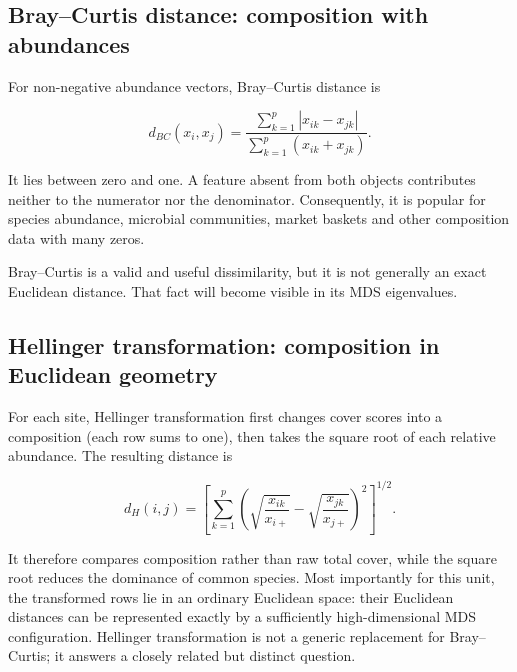 \documentclass[
  english,
]{article}
\begin{document}
\subsection{Bray--Curtis distance: composition with
abundances}\label{braycurtis-distance-composition-with-abundances}

For non-negative abundance vectors, Bray--Curtis distance is

\[d_{BC}(x_i,x_j)=
\frac{\sum_{k=1}^p |x_{ik}-x_{jk}|}
     {\sum_{k=1}^p(x_{ik}+x_{jk})}.\]

It lies between zero and one. A feature absent from both objects
contributes neither to the numerator nor the denominator. Consequently,
it is popular for species abundance, microbial communities, market
baskets and other composition data with many zeros.

Bray--Curtis is a valid and useful dissimilarity, but it is not
generally an exact Euclidean distance. That fact will become visible in
its MDS eigenvalues.

\subsection{Hellinger transformation: composition in Euclidean
geometry}\label{hellinger-transformation-composition-in-euclidean-geometry}

For each site, Hellinger transformation first changes cover scores into
a composition (each row sums to one), then takes the square root of each
relative abundance. The resulting distance is

\[d_H(i,j)=\left[\sum_{k=1}^p\left(\sqrt{\frac{x_{ik}}{x_{i+}}}-
\sqrt{\frac{x_{jk}}{x_{j+}}}\right)^2\right]^{1/2}.\]

It therefore compares composition rather than raw total cover, while the
square root reduces the dominance of common species. Most importantly
for this unit, the transformed rows lie in an ordinary Euclidean space:
their Euclidean distances can be represented exactly by a sufficiently
high-dimensional MDS configuration. Hellinger transformation is not a
generic replacement for Bray--Curtis; it answers a closely related but
distinct question.
\end{document}

